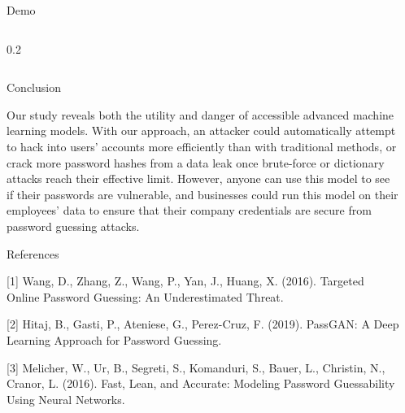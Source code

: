 \documentclass[final]{beamer}
\newlength{\sepwidth}
\newlength{\colwidth}
\newcommand{\separatorcolumn}{\begin{column}{\sepwidth}\end{column}}
\begin{document}
\begin{frame}[t]
\begin{columns}[t]
\begin{column}{\colwidth}
\begin{block}{Demo}
\begin{columns}
\begin{column}{0.2\colwidth}
    \end{column}
    \end{columns}
    
    \end{block}

  \begin{block}{Conclusion}

    Our study reveals both the utility and danger of accessible advanced machine learning models. With our approach, an attacker could automatically attempt to hack into users' accounts more efficiently than with traditional methods, or crack more password hashes from a data leak once brute-force or dictionary attacks reach their effective limit. However, anyone can use this model to see if their passwords are vulnerable, and businesses could run this model on their employees' data to ensure that their company credentials are secure from password guessing attacks.

  \end{block}

  \begin{block}{References}

{\small
    [1] Wang, D., Zhang, Z., Wang, P., Yan, J., Huang, X. (2016). Targeted Online Password Guessing: An Underestimated Threat.
    
    [2] Hitaj, B., Gasti, P., Ateniese, G.,  Perez-Cruz, F. (2019). PassGAN: A Deep Learning Approach for Password Guessing.
    
    [3] Melicher, W., Ur, B., Segreti, S., Komanduri, S., Bauer, L., Christin, N.,  Cranor, L. (2016). Fast, Lean, and Accurate: Modeling Password Guessability Using Neural Networks.
}
  \end{block}

\end{column}

\separatorcolumn
\end{columns}
\end{frame}
\end{document}

